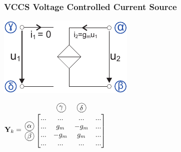 \documentclass[a4paper,twocolumn,10pt]{article}
\newcommand*\kreis[1]{\unitlength1ex\begin{picture}(2.5,2.5)%
\put(0.75,0.75){\circle{3}}\put(0.7,0.7){\makebox(0,0){#1}}\end{picture}}
\begin{document}
\subsubsection*{VCCS Voltage Controlled Current Source}
\begin{minipage}[b]{0.20\textwidth}
\includegraphics[width=\textwidth]{img/KSA_USI}
\end{minipage}
\hfill
\begin{minipage}[b]{0.28\textwidth}
$\textbf{Y}_k=\;\;\begin{matrix}\begin{matrix} & & \;\;\;\kreis{$\gamma$} & \;\;\;\kreis{$\delta$} & \end{matrix}\\\begin{matrix} \; \\ \kreis{$\alpha$} \\ \kreis{$\beta$} \\ \; \end{matrix} \left[\begin{matrix} ... & ... & ... & ... \\ ... & g_m & -g_m & ... \\ ... & -g_m & g_m & ... \\ ...& ... & ... & ... \end{matrix}\right]\\ \; \end{matrix}$\\
\end{minipage}
\end{document}
